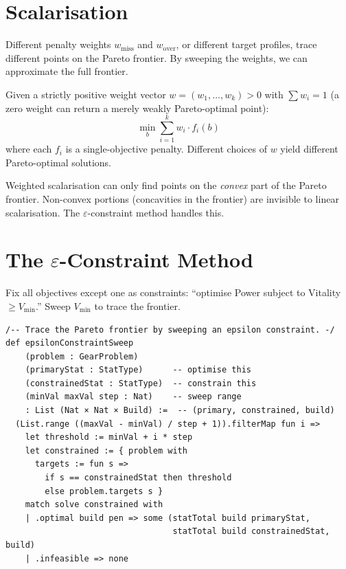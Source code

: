 \documentclass[11pt, a4paper, oneside]{book}
\begin{document}
\section{Scalarisation}

Different penalty weights $w_{\text{miss}}$ and $w_{\text{over}}$, or
different target profiles, trace different points on the Pareto frontier.
By sweeping the weights, we can approximate the full frontier.

\begin{defbox}[title={Weighted Scalarisation}]
Given a strictly positive weight vector $w = (w_1, \ldots, w_k) > 0$ with
$\sum w_i = 1$ (a zero weight can return a merely weakly Pareto-optimal point):
\[
  \min_b \sum_{i=1}^{k} w_i \cdot f_i(b)
\]
where each $f_i$ is a single-objective penalty.  Different choices of $w$
yield different Pareto-optimal solutions.
\end{defbox}

\begin{warningbox}
Weighted scalarisation can only find points on the \emph{convex} part of the
Pareto frontier.  Non-convex portions (concavities in the frontier) are
invisible to linear scalarisation.  The $\varepsilon$-constraint method
handles this.
\end{warningbox}

\section{The $\varepsilon$-Constraint Method}

Fix all objectives except one as constraints: ``optimise Power subject to
Vitality $\geq V_{\min}$.''  Sweep $V_{\min}$ to trace the frontier.

\begin{leanbox}[title={Lean 4 (Mathlib) --- $\varepsilon$-Constraint Sweep}]
\begin{verbatim}
/-- Trace the Pareto frontier by sweeping an epsilon constraint. -/
def epsilonConstraintSweep
    (problem : GearProblem)
    (primaryStat : StatType)      -- optimise this
    (constrainedStat : StatType)  -- constrain this
    (minVal maxVal step : Nat)    -- sweep range
    : List (Nat × Nat × Build) :=  -- (primary, constrained, build)
  (List.range ((maxVal - minVal) / step + 1)).filterMap fun i =>
    let threshold := minVal + i * step
    let constrained := { problem with
      targets := fun s =>
        if s == constrainedStat then threshold
        else problem.targets s }
    match solve constrained with
    | .optimal build pen => some (statTotal build primaryStat,
                                  statTotal build constrainedStat, build)
    | .infeasible => none
\end{verbatim}
\end{leanbox}
\end{document}
